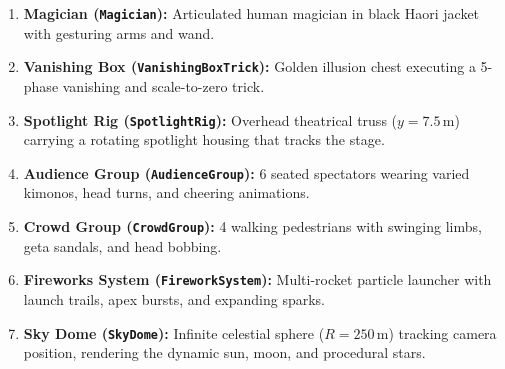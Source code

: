 \begin{enumerate}
    \item \textbf{Magician (\texttt{Magician}):} Articulated human magician in black Haori jacket with gesturing arms and wand.
    \item \textbf{Vanishing Box (\texttt{VanishingBoxTrick}):} Golden illusion chest executing a 5-phase vanishing and scale-to-zero trick.
    \item \textbf{Spotlight Rig (\texttt{SpotlightRig}):} Overhead theatrical truss ($y = 7.5\,\text{m}$) carrying a rotating spotlight housing that tracks the stage.
    \item \textbf{Audience Group (\texttt{AudienceGroup}):} 6 seated spectators wearing varied kimonos, head turns, and cheering animations.
    \item \textbf{Crowd Group (\texttt{CrowdGroup}):} 4 walking pedestrians with swinging limbs, geta sandals, and head bobbing.
    \item \textbf{Fireworks System (\texttt{FireworkSystem}):} Multi-rocket particle launcher with launch trails, apex bursts, and expanding sparks.
    \item \textbf{Sky Dome (\texttt{SkyDome}):} Infinite celestial sphere ($R = 250\,\text{m}$) tracking camera position, rendering the dynamic sun, moon, and procedural stars.
\end{enumerate}
